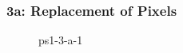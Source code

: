 \documentclass[../report.tex]{subfiles}
\begin{document}
    \begin{frame}
        \frametitle{3a: Replacement of Pixels}
        \begin{figure}[!htb]
            \centering
            \caption{ps1-3-a-1}
        \end{figure}
    \end{frame}
    
\end{document}
